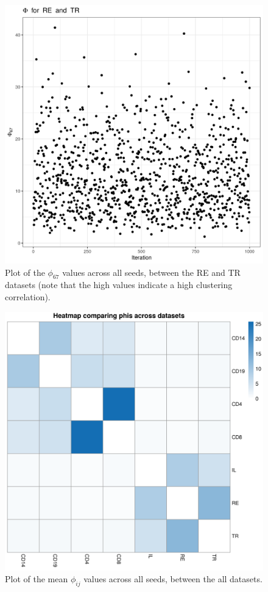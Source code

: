 \documentclass[12pt]{article} %
\begin{document}
	\begin{figure}[h]
		\centering
		\includegraphics[scale=0.75]{Images/Biology_data/Set_1000/All_datasets/Phi_series_plots/file_1_Phi_67.png}
		\caption{Plot of the $\phi_{67}$ values across all seeds, between the RE and TR datasets (note that the high values indicate a high clustering correlation).}
		\label{fig:results:cedar_2:mdi_re_tr_phi_series_plot}
	\end{figure}
	
	\newpage
	
	\begin{figure}[h]
		\centering
		\includegraphics[scale=0.75]{Images/Biology_data/Set_1000/All_datasets/Phi_heatmap_1.png}
		\caption{Plot of the mean $\phi_{ij}$ values across all seeds, between the all datasets.}
		\label{fig:results:cedar_2:mdi_phi_heatmap}
	\end{figure}
	
\end{document}

